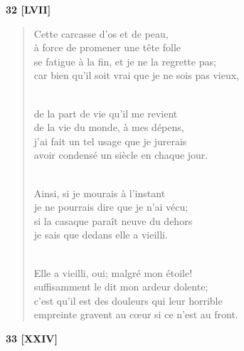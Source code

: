 \documentclass[a4paper,11pt]{book}
\begin{document}
\bigskip

\begin{center} {\bf 32 [LVII]} \end{center}

\begin{verse}
Cette carcasse d'os et de peau, \\
à force de promener une tête folle \\
se fatigue à la fin, et je ne la regrette pas; \\
car bien qu'il soit vrai que je ne sois pas vieux, \\ \

de la part de vie qu'il me revient \\
de la vie du monde, à mes dépens, \\
j'ai fait un tel usage que je jurerais \\
avoir condensé un siècle en chaque jour. \\ \

Ainsi, si je mourais à l'instant \\
je ne pourrais dire que je n'ai vécu; \\
si la casaque paraît neuve du dehors \\
je sais que dedans elle a vieilli. \\ \

Elle a vieilli, oui; malgré mon étoile! \\
suffisamment le dit mon ardeur dolente; \\
c'est qu'il est des douleurs qui leur horrible \\
empreinte gravent au c{\oe}ur si ce n'est au front. \\
\end{verse}

\bigskip

\begin{center} {\bf 33 [XXIV]} \end{center}
\end{document}
